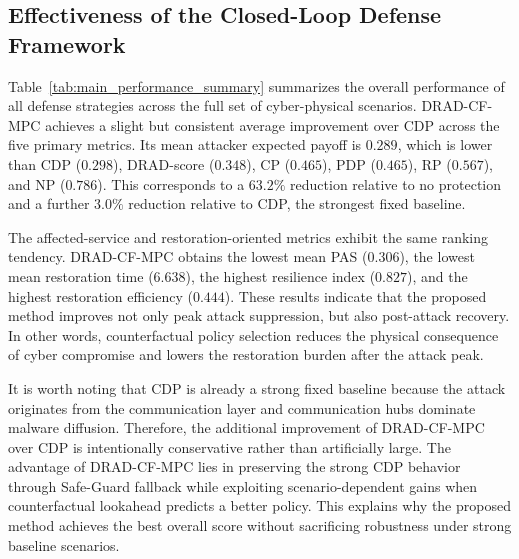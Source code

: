 \documentclass[lettersize,journal]{IEEEtran}
\begin{document}
\subsection{Effectiveness of the Closed-Loop Defense Framework}
\label{subsec:main_results}

Table~\ref{tab:main_performance_summary} summarizes the overall performance of all defense strategies across the full set of cyber-physical scenarios. DRAD-CF-MPC achieves a slight but consistent average improvement over CDP across the five primary metrics. Its mean attacker expected payoff is $0.289$, which is lower than CDP ($0.298$), DRAD-score ($0.348$), CP ($0.465$), PDP ($0.465$), RP ($0.567$), and NP ($0.786$). This corresponds to a $63.2\%$ reduction relative to no protection and a further $3.0\%$ reduction relative to CDP, the strongest fixed baseline.

The affected-service and restoration-oriented metrics exhibit the same ranking tendency. DRAD-CF-MPC obtains the lowest mean PAS ($0.306$), the lowest mean restoration time ($6.638$), the highest resilience index ($0.827$), and the highest restoration efficiency ($0.444$). These results indicate that the proposed method improves not only peak attack suppression, but also post-attack recovery. In other words, counterfactual policy selection reduces the physical consequence of cyber compromise and lowers the restoration burden after the attack peak.

It is worth noting that CDP is already a strong fixed baseline because the attack originates from the communication layer and communication hubs dominate malware diffusion. Therefore, the additional improvement of DRAD-CF-MPC over CDP is intentionally conservative rather than artificially large. The advantage of DRAD-CF-MPC lies in preserving the strong CDP behavior through Safe-Guard fallback while exploiting scenario-dependent gains when counterfactual lookahead predicts a better policy. This explains why the proposed method achieves the best overall score without sacrificing robustness under strong baseline scenarios.
\end{document}
